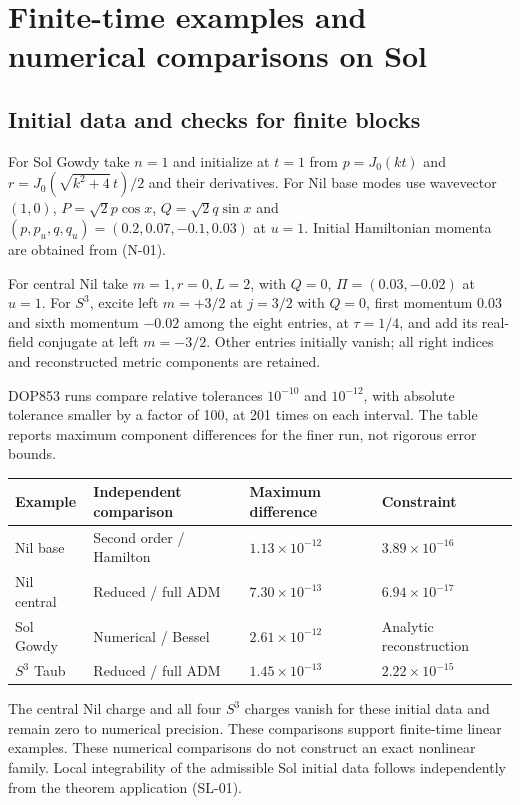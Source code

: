 \section{Finite-time examples and numerical comparisons on Sol}

\subsection{Initial data and checks for finite blocks}

For Sol Gowdy take $n=1$ and initialize at $t=1$ from $p=J_0(kt)$ and $r=J_0(\sqrt{k^2+4}\,t)/2$ and their derivatives. For Nil base modes use wavevector $(1,0)$, $P=\sqrt2p\cos x$, $Q=\sqrt2q\sin x$ and $(p,p_u,q,q_u)=(0.2,0.07,-0.1,0.03)$ at $u=1$. Initial Hamiltonian momenta are obtained from (N-01).

For central Nil take $m=1,r=0,L=2$, with $Q=0$, $\Pi=(0.03,-0.02)$ at $u=1$. For $S^3$, excite left $m=+3/2$ at $j=3/2$ with $Q=0$, first momentum $0.03$ and sixth momentum $-0.02$ among the eight entries, at $\tau=1/4$, and add its real-field conjugate at left $m=-3/2$. Other entries initially vanish; all right indices and reconstructed metric components are retained.

DOP853 runs compare relative tolerances $10^{-10}$ and $10^{-12}$, with absolute tolerance smaller by a factor of 100, at 201 times on each interval. The table reports maximum component differences for the finer run, not rigorous error bounds.

\begin{center}\small\begin{tabularx}{\textwidth}{@{}>{\raggedright\arraybackslash}X>{\raggedright\arraybackslash}X>{\raggedright\arraybackslash}X>{\raggedright\arraybackslash}X@{}}\toprule
Example & Independent comparison & Maximum difference & Constraint\\\midrule
Nil base & Second order / Hamilton & $1.13\times10^{-12}$ & $3.89\times10^{-16}$\\
Nil central & Reduced / full ADM & $7.30\times10^{-13}$ & $6.94\times10^{-17}$\\
Sol Gowdy & Numerical / Bessel & $2.61\times10^{-12}$ & Analytic reconstruction\\
$S^3$ Taub & Reduced / full ADM & $1.45\times10^{-13}$ & $2.22\times10^{-15}$\\
\bottomrule\end{tabularx}\end{center}

The central Nil charge and all four $S^3$ charges vanish for these initial data and remain zero to numerical precision. These comparisons support finite-time linear examples. These numerical comparisons do not construct an exact nonlinear family. Local integrability of the admissible Sol initial data follows independently from the theorem application (SL-01).

